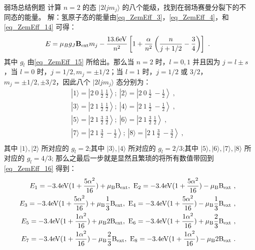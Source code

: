 \begin{example}{弱场总结例题}
计算 $n=2$ 的态 $|2ljm_j\rangle$ 的八个能级，找到在弱场赛曼分裂下的不同态的能量。
解：氢原子态的能量由\autoref{eq_ZemEff_3}，\autoref{eq_ZemEff_4}，和\autoref{eq_ZemEff_14} 可得：
\begin{equation}
E=\mu_Bg_J\mathbf{B}_{\rm{ext}}m_j-\frac{13.6\rm{eV}}{n^2}\left[1+\frac{\alpha}{n^2}\left(\frac{n}{j+1/2}-\frac{3}{4}\right)\right]~.
\end{equation}
其中 $g_l$ 由\autoref{eq_ZemEff_15} 所给出。那么当 $n=2$ 时，$l=0,1$ 并且因为 $j=l\pm s$，当 $l=0$ 时，$j=1/2,m_j=\pm 1/2$；当 $l=1$ 时，$j=1/2$ 或 $3/2$，$m_j=\pm 1/2,\pm 3/2$，因此八个 $|2ljm_j\rangle$ 态分别为：
\begin{align}
|1\rangle =\left|2 \ 0 \ \frac{1}{2} \ \frac{1}{2}\right\rangle;\ 
|2\rangle =\left|2 \ 0 \ \frac{1}{2} \ -\frac{1}{2}\right\rangle~,\\
|3\rangle =\left|2 \ 1 \ \frac{1}{2} \ \frac{1}{2}\right\rangle;\ 
|4\rangle =\left|2 \ 1 \ \frac{1}{2} \ -\frac{1}{2}\right\rangle~,\\
|5\rangle =\left|2 \ 1 \ \frac{3}{2} \ \frac{3}{2}\right\rangle;\ 
|6\rangle =\left|2 \ 1 \ \frac{3}{2} \ \frac{1}{2}\right\rangle~,\\
|7\rangle =\left|2 \ 1 \ \frac{3}{2} \ -\frac{1}{2}\right\rangle;\ 
|8\rangle =\left|2 \ 1 \ \frac{3}{2} \ -\frac{3}{2}\right\rangle~,\\
\end{align}
其中 $|1\rangle,|2\rangle$ 所对应的 $g_l=2$;其中 $|3\rangle,|4\rangle$ 所对应的 $g_l=2/3$;其中 $|5\rangle,|6\rangle,|7\rangle,|8\rangle$ 所对应的 $g_l=4/3$;
那么之最后一步就是显然且繁琐的将所有数值带回到\autoref{eq_ZemEff_16} 得到：
\begin{align}
E_1=-3.4\rm{eV}(1+\frac{5\alpha^2}{16})+\mu_BB_{\rm{ext}},\ 
E_2=-3.4\rm{eV}(1+\frac{5\alpha^2}{16})-\mu_BB_{\rm{ext}}~,\\
E_3=-3.4\rm{eV}(1+\frac{5\alpha^2}{16})+\mu_B\frac{1}{3}B_{\rm{ext}},\ 
E_4=-3.4\rm{eV}(1+\frac{5\alpha^2}{16})-\mu_B\frac{1}{3}B_{\rm{ext}}~,\\
E_5=-3.4\rm{eV}(1+\frac{1\alpha^2}{16})+\mu_B2B_{\rm{ext}},\ 
E_6=-3.4\rm{eV}(1+\frac{1\alpha^2}{16})+\mu_B\frac{2}{3}B_{\rm{ext}}~,\\
E_7=-3.4\rm{eV}(1+\frac{1\alpha^2}{16})-\mu_B\frac{2}{3}B_{\rm{ext}},\ 
E_8=-3.4\rm{eV}(1+\frac{1\alpha^2}{16})-\mu_B2B_{\rm{ext}}~.
\end{align}

\end{example}
